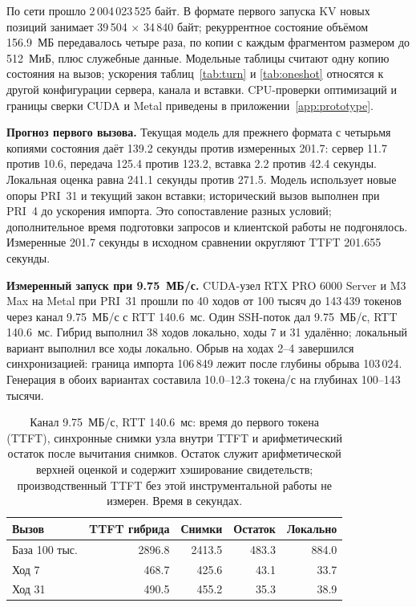 По сети прошло 2\,004\,023\,525 байт. В формате первого запуска KV новых позиций занимает
39\,504 $\times$ 34\,840 байт; рекуррентное состояние объёмом 156.9~МБ передавалось
четыре раза, по копии с каждым фрагментом размером до 512~МиБ, плюс служебные данные.
Модельные таблицы считают одну копию состояния на вызов; ускорения таблиц~\ref{tab:turn} и \ref{tab:oneshot}
относятся к другой конфигурации сервера, канала и вставки.
CPU-проверки оптимизаций и границы сверки CUDA и Metal приведены в приложении~\ref{app:prototype}.

\textbf{Прогноз первого вызова.} Текущая модель для прежнего формата с четырьмя копиями состояния даёт
139.2 секунды против измеренных 201.7: сервер 11.7 против 10.6, передача 125.4 против 123.2,
вставка 2.2 против 42.4 секунды. Локальная оценка равна 241.1 секунды против 271.5.
Модель использует новые опоры PRI~31 и текущий закон вставки; исторический вызов выполнен при PRI~4
до ускорения импорта. Это сопоставление разных условий; дополнительное время подготовки запросов
и клиентской работы не подгонялось. Измеренные 201.7 секунды в исходном сравнении округляют TTFT 201.655 секунды.

\textbf{Измеренный запуск при 9.75~МБ/с.} CUDA-узел RTX PRO 6000 Server
и M3 Max на Metal при PRI~31 прошли по 40 ходов от 100 тысяч до 143\,439 токенов через канал 9.75~МБ/с с RTT 140.6~мс.
Один SSH-поток дал 9.75~МБ/с, RTT 140.6~мс. Гибрид выполнил 38 ходов локально, ходы 7 и 31 удалённо;
локальный вариант выполнил все ходы локально. Обрыв на ходах 2--4 завершился синхронизацией:
граница импорта 106\,849 лежит после глубины обрыва 103\,024. Генерация в обоих вариантах
составила 10.0--12.3 токена/с на глубинах 100--143 тысячи.

\begin{table}[t]
\centering
\caption{Канал 9.75~МБ/с, RTT 140.6~мс: время до первого токена (TTFT), синхронные снимки узла внутри TTFT
и арифметический остаток после вычитания снимков. Остаток служит арифметической верхней оценкой и содержит хэширование свидетельств;
производственный TTFT без этой инструментальной работы не измерен. Время в секундах.}
\label{tab:growing-link}
\footnotesize
\begin{tabular}{lrrrr}
\toprule
Вызов & TTFT гибрида & Снимки & Остаток & Локально \\
\midrule
База 100 тыс. & 2896.8 & 2413.5 & 483.3 & 884.0 \\
Ход 7 & 468.7 & 425.6 & 43.1 & 33.7 \\
Ход 31 & 490.5 & 455.2 & 35.3 & 38.9 \\
\bottomrule
\end{tabular}
\end{table}

